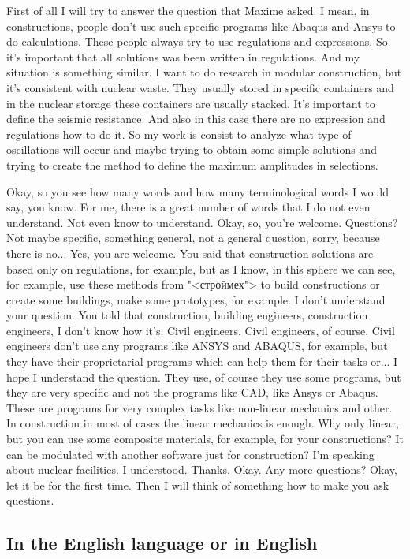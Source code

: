 \documentclass[main.tex]{subfiles}
\begin{document}
First of all I will try to answer the question that Maxime asked.
I mean, in constructions, people don't use such specific programs like Abaqus and Ansys to do calculations.
These people always try to use regulations and expressions.
So it's important that all solutions was been written in regulations.
And my situation is something similar.
I want to do research in modular construction, but it's consistent with nuclear waste.
They usually stored in specific containers and in the nuclear storage these containers are usually stacked.
It's important to define the seismic resistance.
And also in this case there are no expression and regulations how to do it.
So my work is consist to analyze what type of oscillations will occur and maybe trying to obtain some simple solutions and trying to create the method to define the maximum amplitudes in selections.

Okay, so you see how many words and how many terminological words I would say, you know.
For me, there is a great number of words that I do not even understand.
Not even know to understand.
Okay, so, you're welcome.
Questions? Not maybe specific, something general, not a general question, sorry, because there is no...
Yes, you are welcome.
You said that construction solutions are based only on regulations, for example, but as I know, in this sphere we can see, for example, use these methods from "<строймех"> to build constructions or create some buildings, make some prototypes, for example.
I don't understand your question.
You told that construction, building engineers, construction engineers, I don't know how it's.
Civil engineers.
Civil engineers, of course.
Civil engineers don't use any programs like ANSYS and ABAQUS, for example, but they have their proprietarial programs which can help them for their tasks or...
I hope I understand the question.
They use, of course they use some programs, but they are very specific and not the programs like CAD, like Ansys or Abaqus.
These are programs for very complex tasks like non-linear mechanics and other.
In construction in most of cases the linear mechanics is enough.
Why only linear, but you can use some composite materials, for example, for your constructions?
It can be modulated with another software just for construction?
I'm speaking about nuclear facilities.
I understood.
Thanks.
Okay.
Any more questions?
Okay, let it be for the first time.
Then I will think of something how to make you ask questions.

\subsection{In the English language or in English}
\end{document}
